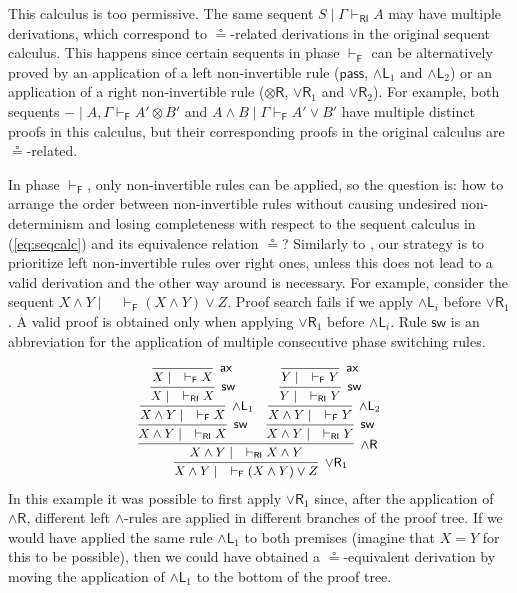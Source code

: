 \documentclass[submission,copyright,creativecommons]{eptcs}
\theoremstyle{definition}
\newcommand{\tr}{\otimes \mathsf{R}}
\newcommand{\pass}{\mathsf{pass}}
\newcommand{\andlone}{\land \mathsf{L}_{1}}
\newcommand{\andltwo}{\land \mathsf{L}_{2}}
\newcommand{\andli}{\land \mathsf{L}_{i}}
\newcommand{\andr}{\land \mathsf{R}}
\newcommand{\orrone}{\lor \mathsf{R}_{1}}
\newcommand{\orrtwo}{\lor \mathsf{R}_{2}}
\newcommand{\ax}{\mathsf{ax}}
\newcommand{\ot}{\otimes}
\newcommand{\RI}{\mathsf{RI}}
\newcommand{\F}{\mathsf{F}}
\newcommand{\sw}{\mathsf{sw}}
\newcommand\niccolo[1]{\mbox{}
{\marginpar{\color{red}NV}}
{\sf\noindent\color{red}#1}}%
\begin{document}
This calculus is too permissive. The same sequent $S \mid \Gamma \vdash_{\RI} A$ may have multiple derivations, which correspond to $\circeq$-related derivations in the original sequent calculus. This happens since certain sequents in phase $\vdash_\F$ can be alternatively proved by an application of a left non-invertible rule ($\pass$, $\andlone$ and $\andltwo$) or an application of a right non-invertible rule ($\tr$, $\orrone$ and $\orrtwo$). For example, both sequents $- \mid A , \Gamma \vdash_{\F} A' \ot B'$ and $A \land B \mid \Gamma \vdash_{\F} A' \lor B'$ have multiple distinct proofs in this calculus, but their corresponding proofs in the original calculus are $\circeq$-related.

In phase $\vdash_\F$, only non-invertible rules can be applied, so the question is: how to arrange the order between non-invertible rules without causing undesired non-determinism and losing completeness with respect to the sequent calculus in (\ref{eq:seqcalc}) and its equivalence relation $\circeq$? Similarly to \cite{UVW:protsn}, our strategy is to prioritize left non-invertible rules over right ones, unless this does not lead to a valid derivation and the other way around is necessary.
For example, consider the sequent $X \land Y \mid \quad \vdash_{\F} (X \land Y) \lor Z$. Proof search fails if we apply $\andli$ before $\orrone$. A valid proof is obtained only when applying $\orrone$ before $\andli$. Rule $\sw$ is an abbreviation for the application of multiple consecutive phase switching rules.


\begin{equation}\label{eq:ex:focused}
  \small
  \begin{array}{c}
     \infer[\orrone]{X \land Y \mid \quad \vdash_\F (X \land Y) \lor Z}{
      \infer[\andr]{X \land Y \mid \quad \vdash_\RI X \land Y}{
        \infer[\sw]{X \land Y \mid \quad \vdash_\RI X}{
          \infer[\andlone]{X \land Y \mid \quad \vdash_\F X}{
          \infer[\sw]{X \mid \quad \vdash_\RI X}{
          \infer[\ax]{X \mid \quad \vdash_\F X}{}
        }}}
        &
        \infer[\sw]{X \land Y \mid \quad \vdash_\RI Y}{
        \infer[\andltwo]{X \land Y \mid \quad \vdash_\F Y}{
          \infer[\sw]{Y \mid \quad \vdash_\RI Y}{
          \infer[\ax]{Y \mid \quad \vdash_\F Y}{}
        }}}
      }
    }
  \end{array}
\end{equation}
In this example it was possible to first apply $\orrone$ since, after the application of $\andr$, different left $\land$-rules are applied in different branches of the proof tree. If we would have applied  the same rule $\andlone$ to both premises (imagine that $X = Y$ for this to be possible), then we could have obtained a $\circeq$-equivalent derivation by moving the application of $\andlone$ to the bottom of the proof tree. 
\end{document}

